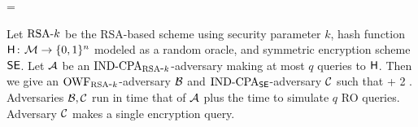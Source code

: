 
\bnm
  \AdvOWFRSA{\RSAk}{\advA} = \Prob{\OWF_{\RSAk}^\advA\Rightarrow\true}
\enm


\begin{theorem*}
Let $\textnormal{RSA}\mbox{-} k$ be the RSA-based scheme using
security parameter $k$, hash function
$\mathsf{H}{{\kern .05em}\colon{\kern .05em}}{\cal M}\rightarrow\{0,1\}^n$ modeled as a random oracle, and
symmetric encryption scheme $\textnormal{\textsf{SE}}$. Let ${\mathcal A}$ be
an $\textnormal{IND-CPA}_{\textnormal{RSA}\mbox{-} k}$-adversary making at most $q$ queries to
$\mathsf{H}$. Then we give an
$\textnormal{OWF}_{\textnormal{RSA}\mbox{-} k}$-adversary ${\mathcal B}$ and $\textnormal{IND-CPA}_{\textnormal{\textsf{SE}}}$-adversary
${\mathcal C}$ such that
\bnm
  \AdvINDCPA{\RSAk,\Horacle}{\advA} \cdotsm\AdvOWF{\RSAk}{\advB} +  
        2\cdotsm\AdvROR{\SEscheme}{\advC}  \;.
\enm
Adversaries ${\mathcal B},{\mathcal C}$ run in time that of ${\mathcal A}$ plus 
the time to simulate $q$ RO queries. Adversary ${\mathcal C}$ makes a single encryption query.
\end{theorem*}


